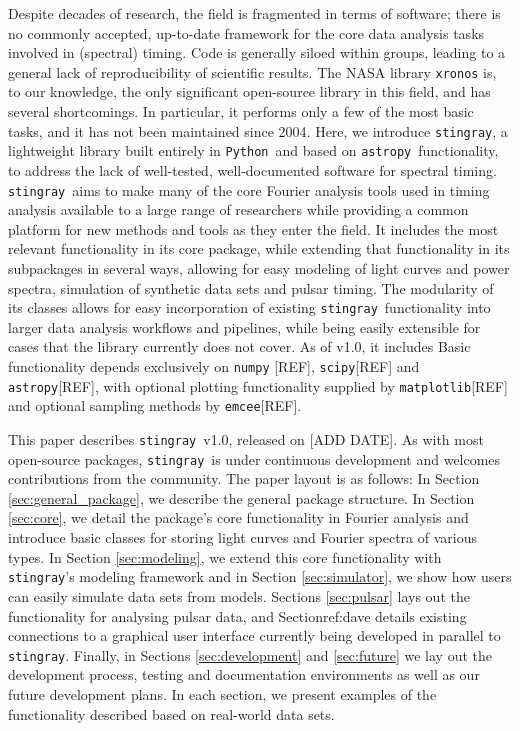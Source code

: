 \documentclass[12pt]{emulateapj}
\newcommand{\stingray}{\texttt{stingray}}
\newcommand{\python}{\texttt{Python}}
\newcommand{\astropy}{\texttt{astropy}}
\begin{document}
Despite decades of research, the field is fragmented in terms of software; there is no commonly accepted, up-to-date framework for the core data analysis tasks involved in (spectral) timing. Code is generally siloed within groups, leading to a general lack of reproducibility of scientific results. The NASA library \texttt{xronos} is, to our knowledge, the only significant open-source library in this field, and has several shortcomings. In particular, it performs only a few of the most basic tasks, and it has not been maintained since 2004. Here, we introduce \stingray, a lightweight library built entirely in \python\ and based on \astropy\ functionality, to address the lack of well-tested, well-documented software for spectral timing. \stingray\ aims to make many of the core Fourier analysis tools used in timing analysis available to a large range of researchers while providing a common platform for new methods and tools as they enter the field. It includes the most relevant functionality in its core package, while extending that functionality in its subpackages in several ways, allowing for easy modeling of light curves and power spectra, simulation of synthetic data sets and pulsar timing. 
The modularity of its classes allows for easy incorporation of existing \stingray\ functionality into larger data analysis workflows and pipelines, while being easily extensible for cases that the library currently does not cover. As of v1.0, it includes Basic functionality depends exclusively on \texttt{numpy} [REF], \texttt{scipy}[REF] and \texttt{astropy}[REF], with optional plotting functionality supplied by \texttt{matplotlib}[REF] and optional sampling methods by \texttt{emcee}[REF].

This paper describes \stingray\ v1.0, released on [ADD DATE]. As with most open-source packages, \stingray\ is under continuous development and welcomes contributions from the community.
The paper layout is as follows: In Section \ref{sec:general_package}, we describe the general package structure. In Section \ref{sec:core}, we detail the package's core functionality in Fourier analysis and introduce basic classes for storing light curves and Fourier spectra of various types. In Section \ref{sec:modeling}, we extend this core functionality with \stingray's modeling framework and in Section \ref{sec:simulator}, we show how users can easily simulate data sets from models. Sections \ref{sec:pulsar} lays out the functionality for analysing pulsar data, and Section{ref:dave} details existing connections to a graphical user interface currently being developed in parallel to \stingray. Finally, in Sections \ref{sec:development} and \ref{sec:future} we lay out the development process, testing and documentation environments as well as our future development plans. In each section, we present examples of the functionality described based on real-world data sets.
\end{document}

